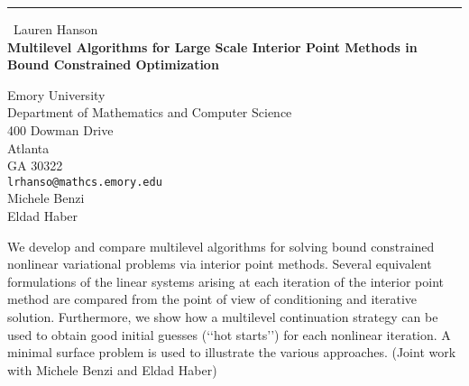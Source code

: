 \documentclass{report}
\begin{document}
\begin{center}
\rule{6in}{1pt} \
{\large Lauren Hanson \\
{\bf Multilevel Algorithms for Large Scale Interior Point Methods in Bound Constrained Optimization}}

Emory University \\ Department of Mathematics and Computer Science \\ 400 Dowman Drive \\ Atlanta \\ GA 30322
\\
{\tt lrhanso@mathcs.emory.edu}\\
Michele Benzi\\
Eldad Haber\end{center}

We develop and compare multilevel algorithms for solving bound
constrained nonlinear variational problems via interior point
methods. Several equivalent formulations of the linear systems
arising at each iteration of the interior point method are compared
from the point of view of conditioning and iterative solution.
Furthermore, we show how a multilevel continuation strategy can be
used to obtain good initial guesses (\lq\lq hot starts\rq\rq) for
each nonlinear iteration. A minimal surface problem is used to
illustrate the various approaches. (Joint work with Michele Benzi
and Eldad Haber)
\end{document}
